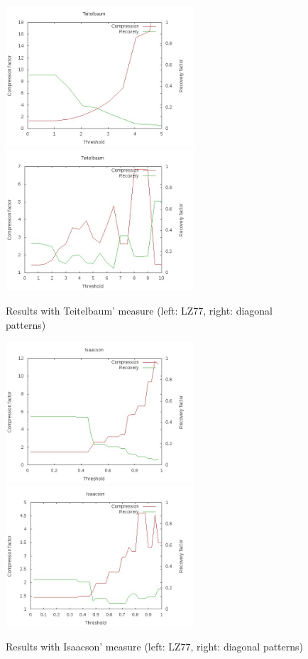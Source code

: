 \documentclass[a4paper,10pt]{article}
\begin{document}
\begin{figure}[h!]
\centering
\includegraphics[width=7cm]{images/Teitelbaum77.jpg}\hspace{0.5cm}
\includegraphics[width=7cm]{images/TeitelbaumDiag.jpg}
\caption{Results with Teitelbaum' measure (left: LZ77, right: diagonal patterns)\label{teitelbaum}}
\end{figure}

\begin{figure}[h!]
\centering
\includegraphics[width=7cm]{images/Isaacson77.jpg}\hspace{0.5cm}
\includegraphics[width=7cm]{images/IsaacsonDiag.jpg}
\caption{Results with Isaacson' measure (left: LZ77, right: diagonal patterns)\label{isaacson}}
\end{figure}
\end{document}
